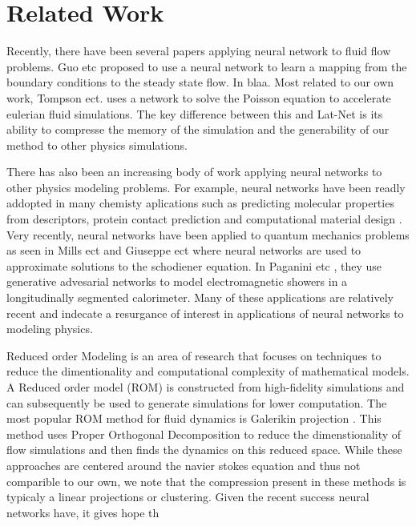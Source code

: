 \documentclass{article}
\begin{document}
\section{Related Work}

Recently, there have been several papers applying neural network to fluid flow problems. Guo etc \cite{guo2016convolutional} proposed to use a neural network to learn a mapping from the boundary conditions to the steady state flow. In \cite{yang2016data} blaa. Most related to our own work, Tompson ect. \cite{tompson2016accelerating} uses a network to solve the Poisson equation to accelerate eulerian fluid simulations. The key difference between this and Lat-Net is its ability to compresse the memory of the simulation and the generability of our method to other physics simulations.

There has also been an increasing body of work applying neural networks to other physics modeling problems. For example, neural networks have been readly addopted in many chemisty aplications such as predicting molecular properties from descriptors, protein contact prediction and computational material design \cite{goh2017deep}. Very recently, neural networks have been applied to quantum mechanics problems as seen in Mills ect \cite{mills2017deep} and Giuseppe ect \cite{carleo2017solving} where neural networks are used to approximate solutions to the schodiener equation. In Paganini etc \cite{2017arXiv170502355P}, they use generative advesarial networks \cite{goodfellow2014generative} to model electromagnetic showers in a longitudinally segmented calorimeter. Many of these applications are relatively recent and indecate a resurgance of interest in applications of neural networks to modeling physics.

Reduced order Modeling is an area of research that focuses on techniques to reduce the dimentionality and computational complexity of mathematical models. A Reduced order model (ROM) is constructed from high-fidelity simulations and can subsequently be used to generate simulations for lower computation. The most popular ROM method for fluid dynamics is Galerikin projection \cite{barone2009reduced}. This method uses Proper Orthogonal Decomposition to reduce the dimenstionality of flow simulations and then finds the dynamics on this reduced space.  
While these approaches are centered around the navier stokes equation and thus not comparible to our own, we note that the compression present in these methods is typicaly a linear projections or clustering. Given the recent success neural networks have, it gives hope th
\end{document}
